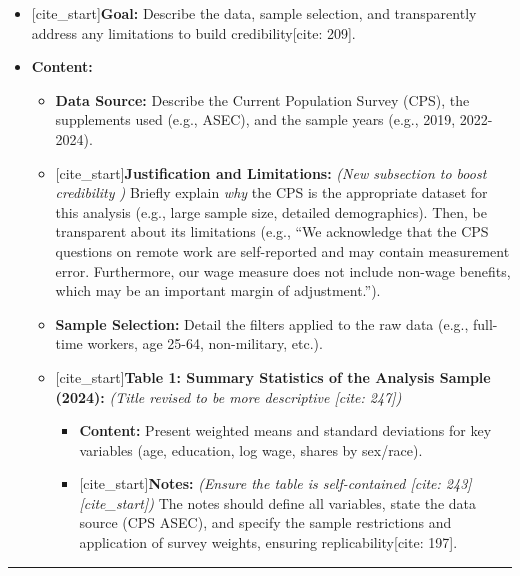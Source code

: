 \documentclass[
  11pt,
  letterpaper,
  DIV=11,
  numbers=noendperiod]{scrartcl}
\providecommand{\tightlist}{%
  \setlength{\itemsep}{0pt}\setlength{\parskip}{0pt}}\usepackage{longtable,booktabs,array}
\begin{document}
\begin{itemize}
\tightlist
\item
  {[}cite\_start{]}\textbf{Goal:} Describe the data, sample selection,
  and transparently address any limitations to build credibility{[}cite:
  209{]}.
\item
  \textbf{Content:}

  \begin{itemize}
  \tightlist
  \item
    \textbf{Data Source:} Describe the Current Population Survey (CPS),
    the supplements used (e.g., ASEC), and the sample years (e.g., 2019,
    2022-2024).
  \item
    {[}cite\_start{]}\textbf{Justification and Limitations:} \emph{(New
    subsection to boost credibility )} Briefly explain \emph{why} the
    CPS is the appropriate dataset for this analysis (e.g., large sample
    size, detailed demographics). Then, be transparent about its
    limitations (e.g., ``We acknowledge that the CPS questions on remote
    work are self-reported and may contain measurement error.
    Furthermore, our wage measure does not include non-wage benefits,
    which may be an important margin of adjustment.'').
  \item
    \textbf{Sample Selection:} Detail the filters applied to the raw
    data (e.g., full-time workers, age 25-64, non-military, etc.).
  \item
    {[}cite\_start{]}\textbf{Table 1: Summary Statistics of the Analysis
    Sample (2024):} \emph{(Title revised to be more descriptive {[}cite:
    247{]})}

    \begin{itemize}
    \tightlist
    \item
      \textbf{Content:} Present weighted means and standard deviations
      for key variables (age, education, log wage, shares by sex/race).
    \item
      {[}cite\_start{]}\textbf{Notes:} \emph{(Ensure the table is
      self-contained {[}cite: 243{]}{[}cite\_start{]})} The notes should
      define all variables, state the data source (CPS ASEC), and
      specify the sample restrictions and application of survey weights,
      ensuring replicability{[}cite: 197{]}.
    \end{itemize}
  \end{itemize}
\end{itemize}

\begin{center}\rule{0.5\linewidth}{0.5pt}\end{center}
\end{document}
